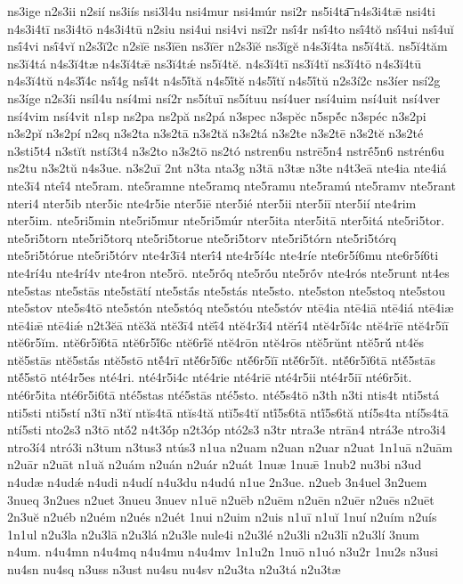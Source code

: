 {ns3ige
n2s3ii
n2sií
ns3iís
nsi3l4u
nsi4mur
nsi4múr
nsi2r
ns5i4ta͞
n4s3i4tǣ
nsi4ti
n4s3i4tī
ns3i4tō
n4s3i4tū
n2siu
nsi4ui
nsi4vi
nsī2r
nsī́4r
nsī́4to
nsī́4tŏ
nsī́4ui
nsī́4uĭ
nsī́4vi
nsī́4vĭ
n2s3ĭ2c
n2sĭē
ns3ĭēn
ns3ĭēr
n2s3ĭĕ
ns3ĭgĕ
n4s3ĭ4ta
ns5ĭ4tă.
ns5ĭ4tăm
ns3ĭ4tá
n4s3ĭ4tæ
n4s3ĭ4tǣ
ns3ĭ4tǽ
ns5ĭ4tĕ.
n4s3ĭ4tī
ns3ĭ4tĭ
ns3ĭ4tō
n4s3ĭ4tū
n4s3ĭ4tŭ
n4s3ĭ́4c
nsĭ́4g
nsĭ́4t
n4s5ĭ́tă
n4s5ĭ́tĕ
n4s5ĭ́tĭ
n4s5ĭ́tŭ
n2s3í2c
ns3íer
nsí2g
ns3íge
n2s3íi
nsíl4u
nsí4mi
nsí2r
ns5ítuī
ns5ítuu
nsí4uer
nsí4uim
nsí4uit
nsí4ver
nsí4vim
nsí4vit
n1sp
ns2pa
ns2pă
ns2pá
n3spec
n3spĕc
n5spĕ́c
n3spéc
n3s2pi
n3s2pĭ
n3s2pí
n2sq
n3s2ta
n3s2tā
n3s2tă
n3s2tá
n3s2te
n3s2tē
n3s2tĕ
n3s2té
n3sti5t4
n3stĭt
nstí3t4
n3s2to
n3s2tō
ns2tó
nstren6u
nstrē5n4
nstrḗ5n6
nstrén6u
ns2tu
n3s2tŭ
n4s3ue.
n3s2uī
2nt
n3ta
nta3g
n3tā
n3tæ
n3te
n4t3eā
nte4ia
nte4iá
nte3ī4
nteī́4
nte5ram.
nte5ramne
nte5ramq
nte5ramu
nte5ramú
nte5ramv
nte5rant
nteri4
nter5ib
nter5ic
nte4r5ie
nter5iē
nter5ié
nter5ii
nter5iī
nter5ií
nte4rim
nter5im.
nte5ri5min
nte5ri5mur
nte5ri5múr
nter5ita
nter5itā
nter5itá
nte5ri5tor.
nte5ri5torn
nte5ri5torq
nte5ri5torue
nte5ri5torv
nte5ri5tórn
nte5ri5tórq
nte5ri5tórue
nte5ri5tórv
nte4r3ī4
nterī́4
nte4r5í4c
nte4ríe
nte6r5í6mu
nte6r5í6ti
nte4rí4u
nte4rí4v
nte4ron
nte5rō.
nte5rṓq
nte5rṓu
nte5rṓv
nte4rós
nte5runt
nt4es
nte5stas
nte5stās
nte5stātí
nte5stā́s
nte5stás
nte5sto.
nte5ston
nte5stoq
nte5stou
nte5stov
nte5s4tō
nte5stón
nte5stóq
nte5stóu
nte5stóv
ntē4ia
ntē4iā
ntē4iá
ntē4iæ
ntē4iǣ
ntē4iǽ
n2t3ĕā
ntĕ3ă
ntĕ3ī4
ntĕī́4
ntĕ4r3ī4
ntĕrī́4
ntĕ4r5ĭ4c
ntĕ4rĭē
ntĕ4r5ĭī
ntĕ6r5ĭm.
ntĕ6r5ĭ6tā
ntĕ6r5ĭ́6c
ntĕ6rĭ́ĕ
ntĕ4rōn
ntĕ4rōs
ntĕ5rŭnt
ntĕ5rŭ́
nt4ĕs
ntĕ5stās
ntĕ5stā́s
ntĕ5stō
ntĕ́4rī
ntĕ́6r5ĭ6c
ntĕ́6r5ĭī
ntĕ́6r5ĭt.
ntĕ́6r5ĭ6tā
ntĕ́5stās
ntĕ́5stō
nté4r5es
nté4ri.
nté4r5i4c
nté4rie
nté4riē
nté4r5ii
nté4r5iī
nté6r5it.
nté6r5ita
nté6r5i6tā
nté5stas
nté5stās
nté5sto.
nté5s4tō
n3th
n3ti
ntis4t
nti5stá
nti5sti
nti5stí
n3tī
n3tĭ
ntĭs4tā
ntĭs4tă
ntĭ5s4tĭ
ntĭ́5s6tā
ntĭ́5s6tă
ntí5s4ta
ntí5s4tā
ntí5sti
nto2s3
n3tō
ntŏ́2
n4t3ŏ́p
n2t3óp
ntó2s3
n3tr
ntra3e
ntrān4
ntrá3e
ntro3i4
ntro3í4
ntró3i
n3tum
n3tus3
ntús3
n1ua
n2uam
n2uan
n2uar
n2uat
1n1uā
n2uām
n2uār
n2uāt
n1uă
n2uám
n2uán
n2uár
n2uát
1nuæ
1nuǣ
1nub2
nu3bi
n3ud
n4udæ
n4udǽ
n4udi
n4udí
n4u3du
n4udú
n1ue
2n3ue.
n2ueb
3n4uel
3n2uem
3nueq
3n2ues
n2uet
3nueu
3nuev
n1uē
n2uēb
n2uēm
n2uēn
n2uēr
n2uēs
n2uēt
2n3uĕ
n2uéb
n2uém
n2ués
n2uét
1nui
n2uim
n2uis
n1uī
n1uĭ
1nuí
n2uím
n2uís
1n1ul
n2u3la
n2u3lā
n2u3lá
n2u3le
nule4i
n2u3lé
n2u3li
n2u3lī
n2u3lí
3num
n4um.
n4u4mn
n4u4mq
n4u4mu
n4u4mv
1n1u2n
1nuō
n1uó
n3u2r
1nu2s
n3usi
nu4sn
nu4sq
n3uss
n3ust
nu4su
nu4sv
n2u3ta
n2u3tá
n2u3tæ
}
